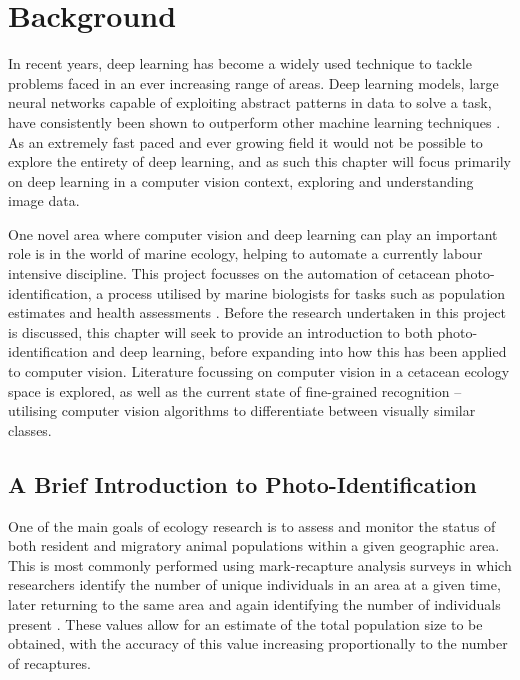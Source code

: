 \chapter{Background}\label{ch:Background}

In recent years, deep learning has become a widely used technique to tackle problems faced in an ever increasing range of areas. Deep learning models, large neural networks capable of exploiting abstract patterns in data to solve a task, have consistently been shown to outperform other machine learning techniques \cite{lecun_deep_2015, zhang_machine_2017, korotcov_comparison_2017, paterakis_deep_2017}. As an extremely fast paced and ever growing field it would not be possible to explore the entirety of deep learning, and as such this chapter will focus primarily on deep learning in a computer vision context, exploring and understanding image data. 

One novel area where computer vision and deep learning can play an important role is in the world of marine ecology, helping to automate a currently labour intensive discipline. This project focusses on the automation of cetacean photo-identification, a process utilised by marine biologists for tasks such as population estimates and health assessments \cite{holmberg_estimating_2009, cheney_long-term_2014, lockyer_observations_1990, van_bressem_visual_2018}. Before the research undertaken in this project is discussed, this chapter will seek to provide an introduction to both photo-identification and deep learning, before expanding into how this has been applied to computer vision. Literature focussing on computer vision in a cetacean ecology space is explored, as well as the current state of fine-grained recognition -- utilising computer vision algorithms to differentiate between visually similar classes.

\section{A Brief Introduction to Photo-Identification}\label{ch:Background,sec:photo-id}

One of the main goals of ecology research is to assess and monitor the status of both resident and migratory animal populations within a given geographic area. This is most commonly performed using mark-recapture analysis surveys in which researchers identify the number of unique individuals in an area at a given time, later returning to the same area and again identifying the number of individuals present \cite{constantine_abundance_2012, bigg_assessment_1982, sharpe_indian_2019, cheney_long-term_2014, arso_civil_changing_2019, tyson_moore_final_2020}. These values allow for an estimate of the total population size to be obtained, with the accuracy of this value increasing proportionally to the number of recaptures.

